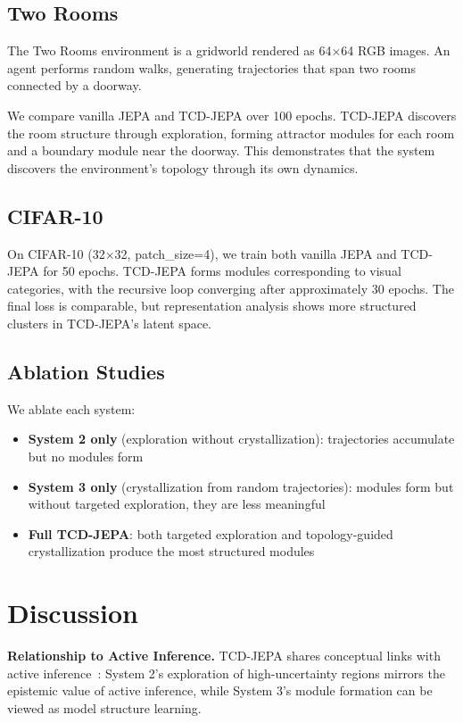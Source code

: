 \documentclass[10pt,twocolumn]{article}
\begin{document}
\subsection{Two Rooms}

The Two Rooms environment is a gridworld rendered as 64$\times$64 RGB images. An agent performs random walks, generating trajectories that span two rooms connected by a doorway.

We compare vanilla JEPA and TCD-JEPA over 100 epochs. TCD-JEPA discovers the room structure through exploration, forming attractor modules for each room and a boundary module near the doorway. This demonstrates that the system discovers the environment's topology through its own dynamics.

\subsection{CIFAR-10}

On CIFAR-10 (32$\times$32, patch\_size=4), we train both vanilla JEPA and TCD-JEPA for 50 epochs. TCD-JEPA forms modules corresponding to visual categories, with the recursive loop converging after approximately 30 epochs. The final loss is comparable, but representation analysis shows more structured clusters in TCD-JEPA's latent space.

\subsection{Ablation Studies}

We ablate each system:
\begin{itemize}
    \item \textbf{System 2 only} (exploration without crystallization): trajectories accumulate but no modules form
    \item \textbf{System 3 only} (crystallization from random trajectories): modules form but without targeted exploration, they are less meaningful
    \item \textbf{Full TCD-JEPA}: both targeted exploration and topology-guided crystallization produce the most structured modules
\end{itemize}

\section{Discussion}

\textbf{Relationship to Active Inference.} TCD-JEPA shares conceptual links with active inference~\citep{friston2010free}: System 2's exploration of high-uncertainty regions mirrors the epistemic value of active inference, while System 3's module formation can be viewed as model structure learning.
\end{document}
